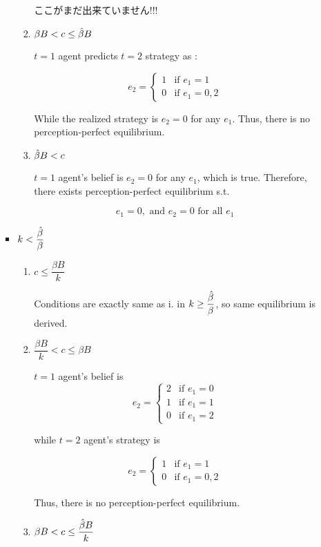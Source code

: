 \documentclass{jsarticle}
\begin{document}
\begin{enumerate}
\begin{enumerate}
\begin{itemize}
\begin{enumerate}
  ここがまだ出来ていません!!!
  
  \item $\beta B < c \leq \Hat{\beta} B $
  
  $t=1$ agent predicts $t=2$ strategy as :
 
  \[e_2 = \begin{cases}
  1 & \text{if } e_1=1 \\
 0 & \text{if } e_1=0,2
 \end{cases} \]
 
 While the realized strategy is $e_2=0$ for any $e_1$. Thus, there is no perception-perfect equilibrium.
 
  \item $\Hat{\beta} B < c$
  
  $t=1$ agent's belief is $e_2=0$ for any $e_1$, which is true. Therefore, there exists perception-perfect equilibrium s.t.
  
  \[e_1=0, \text{ and } e_2=0 \text{ for all }e_1 \]
  
  \end{enumerate}
 
 \item $k < \dfrac{\Hat{\beta}}{\beta}$
 
 \begin{enumerate}
  
  \item $c \leq \dfrac{\beta B}{k}$
  
  Conditions are exactly same as i. in $k \geq \dfrac{\Hat{\beta}}{\beta}$, so same equilibrium is derived.
  
  \item $\dfrac{\beta B}{k} < c \leq \beta B $
  
   $t=1$ agent's belief is
 \[e_2 = \begin{cases}
 2 & \text{if } e_1=0 \\
 1 & \text{if } e_1=1 \\
 0 & \text{if } e_1=2
 \end{cases} \]
 
 while $t=2$ agent's strategy is
 
 \[e_2 = \begin{cases}
 1 & \text{if } e_1=1 \\
 0 & \text{if } e_1=0,2
 \end{cases} \]
 
 Thus, there is no perception-perfect equilibrium.
  
  \item $\beta B < c \leq \dfrac{\Hat{\beta} B}{k}$
  

\end{enumerate}
\end{itemize}
\end{enumerate}
\end{enumerate}
\end{document}
